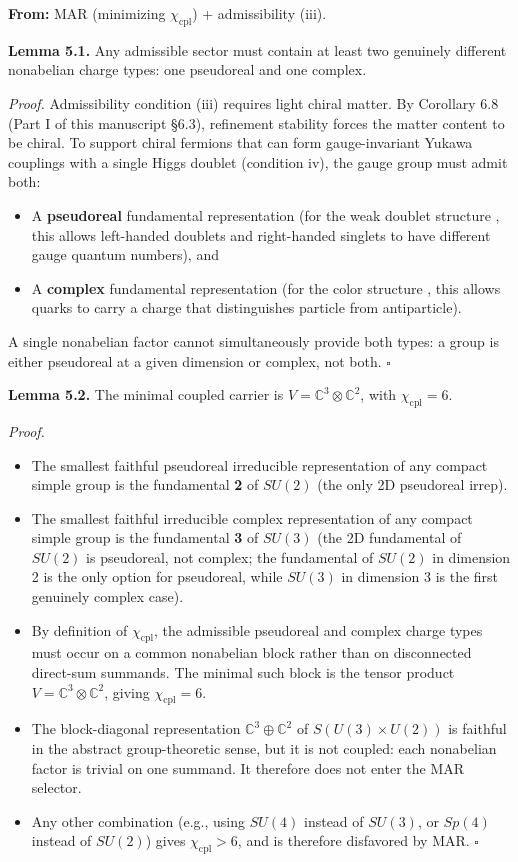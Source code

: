 \textbf{From:} MAR (minimizing \(\chi_{\mathrm{cpl}}\)) + admissibility (iii).

\textbf{Lemma 5.1.} Any admissible sector must contain at least two genuinely different nonabelian charge types: one pseudoreal and one complex.

\emph{Proof.} Admissibility condition (iii) requires light chiral matter. By Corollary 6.8 (Part I of this manuscript §6.3), refinement stability forces the matter content to be chiral. To support chiral fermions that can form gauge-invariant Yukawa couplings with a single Higgs doublet (condition iv), the gauge group must admit both:

\begin{itemize}
\tightlist
\item
  A \textbf{pseudoreal} fundamental representation (for the weak doublet structure , this allows left-handed doublets and right-handed singlets to have different gauge quantum numbers), and
\item
  A \textbf{complex} fundamental representation (for the color structure , this allows quarks to carry a charge that distinguishes particle from antiparticle).
\end{itemize}

A single nonabelian factor cannot simultaneously provide both types: a group is either pseudoreal at a given dimension or complex, not both. \(\square\)

\textbf{Lemma 5.2.} The minimal coupled carrier is \(V = \mathbb{C}^3 \otimes \mathbb{C}^2\), with \(\chi_{\mathrm{cpl}} = 6\).

\emph{Proof.}

\begin{itemize}
\tightlist
\item
  The smallest faithful pseudoreal irreducible representation of any compact simple group is the fundamental \textbf{2} of \(SU(2)\) (the only 2D pseudoreal irrep).
\item
  The smallest faithful irreducible complex representation of any compact simple group is the fundamental \textbf{3} of \(SU(3)\) (the 2D fundamental of \(SU(2)\) is pseudoreal, not complex; the fundamental of \(SU(2)\) in dimension 2 is the only option for pseudoreal, while \(SU(3)\) in dimension 3 is the first genuinely complex case).
\item
  By definition of \(\chi_{\mathrm{cpl}}\), the admissible pseudoreal and complex charge types must occur on a common nonabelian block rather than on disconnected direct-sum summands. The minimal such block is the tensor product \(V = \mathbb{C}^3 \otimes \mathbb{C}^2\), giving \(\chi_{\mathrm{cpl}} = 6\).
\item
  The block-diagonal representation \(\mathbb{C}^3 \oplus \mathbb{C}^2\) of \(S(U(3) \times U(2))\) is faithful in the abstract group-theoretic sense, but it is not coupled: each nonabelian factor is trivial on one summand. It therefore does not enter the MAR selector.
\item
  Any other combination (e.g., using \(SU(4)\) instead of \(SU(3)\), or \(Sp(4)\) instead of \(SU(2)\)) gives \(\chi_{\mathrm{cpl}} > 6\), and is therefore disfavored by MAR. \(\square\)
\end{itemize}

